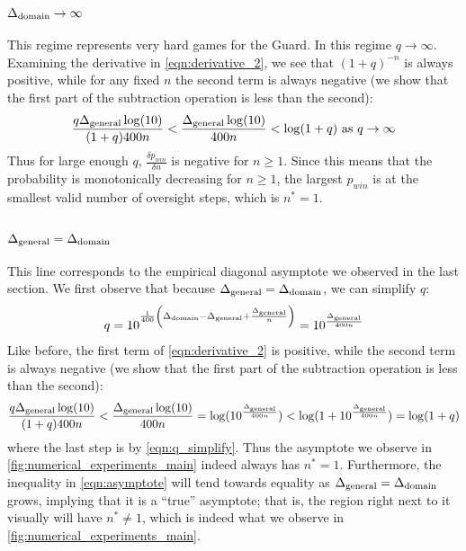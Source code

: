 \documentclass{article}
\begin{document}
\subsubsection{$\Delta_{\rm domain} \rightarrow \infty$}
This regime represents very hard games for the Guard. In this regime $q \rightarrow \infty$. Examining the derivative in \cref{eqn:derivative_2}, we see that $(1 + q)^{-n}$ is always positive, while for any fixed $n$ the second term is always negative (we show that the first part of the subtraction operation is less than the second):
\begin{align}
    \frac{q\Delta_{\rm general} \log(10)}{(1 + q)400n} < \frac{\Delta_{\rm general} \log(10)}{400n} < \log(1 + q) \text{ as $q \rightarrow \infty$}
\end{align}
Thus for large enough $q$, $\frac{\delta p_{win}}{\delta n}$ is negative for $n \ge 1$. Since this means that the probability is monotonically decreasing for $n \ge 1$, the largest $p_{win}$ is at the smallest valid number of oversight steps, which is $n^* = 1$.

\subsubsection{$\Delta_{\rm general} = \Delta_{\rm domain}$}
This line corresponds to the empirical diagonal asymptote we observed in the last section. We first observe that because $\Delta_{\rm general} = \Delta_{\rm domain}$, we can simplify $q$:
\begin{align}
    \label{eqn:q_simplify}
    q = 10^{\frac{1}{400}\left(\Delta_{\rm domain} - \Delta_{\rm general} + \frac{\Delta_{\rm general}}{n}\right)} = 10^{\frac{\Delta_{\rm general}}{400n}}
\end{align}
Like before, the first term of \cref{eqn:derivative_2} is positive, while the second term is always negative (we show that the first part of the subtraction operation is less than the second):
\begin{align}
    \label{eqn:asymptote}
    \frac{q\Delta_{\rm general} \log(10)}{(1 + q)400n} < \frac{\Delta_{\rm general} \log(10)}{400n} =\log(10^{\frac{\Delta_{\rm general}}{400n}}) < \log(1 + 10^{\frac{\Delta_{\rm general}}{400n}}) = \log(1 + q)
\end{align}
where the last step is by \cref{eqn:q_simplify}. Thus the asymptote we observe in \cref{fig:numerical_experiments_main} indeed always has $n^* = 1$.  Furthermore, the inequality in \cref{eqn:asymptote} will tend towards equality as $\Delta_{\rm general} = \Delta_{\rm domain}$ grows, implying that it is a ``true'' asymptote; that is, the region right next to it visually will have $n^* \ne 1$, which is indeed what we observe in \cref{fig:numerical_experiments_main}.
\end{document}

